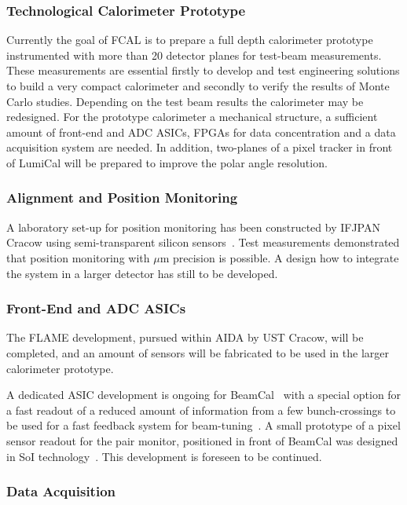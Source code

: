 \subsubsection{Technological Calorimeter Prototype}

Currently the goal of FCAL is to prepare a full depth calorimeter prototype instrumented with more than 20
detector planes for test-beam measurements. These measurements
are essential firstly to develop and test engineering solutions to build a very compact calorimeter and
secondly to verify the results of Monte Carlo studies. Depending on the test beam
results the calorimeter may be redesigned.
For the prototype calorimeter
a mechanical structure, a sufficient amount of front-end and ADC ASICs, FPGAs for
data concentration and
a data acquisition system are needed. In addition, 
two-planes of a pixel tracker in front of LumiCal will be prepared to improve the polar angle resolution.

\subsubsection{Alignment and Position Monitoring }

A laboratory set-up for position monitoring has been constructed by IFJPAN Cracow using semi-transparent
silicon sensors~\cite{EUDETREPORT-2008-05}. Test measurements demonstrated that position monitoring 
with $\mu$m precision is possible. A design how to integrate the system in a larger detector has still to be developed. 

\subsubsection{Front-End and ADC ASICs}

The FLAME development, pursued within AIDA by UST Cracow, will be completed, and an amount of sensors will be fabricated
to be used in the larger calorimeter prototype.

A dedicated ASIC development is ongoing for BeamCal~\cite{6200898}
with a special option for a fast readout of a reduced amount of
information from a few bunch-crossings to be used for a fast feedback system for beam-tuning~\cite{1748-0221-3-10-P10004}.
A small prototype of a pixel sensor readout for the pair monitor, positioned in front of BeamCal was designed in SoI
technology~\cite{Sato201153}. This development is foreseen to be continued.

\subsubsection{Data Acquisition}

